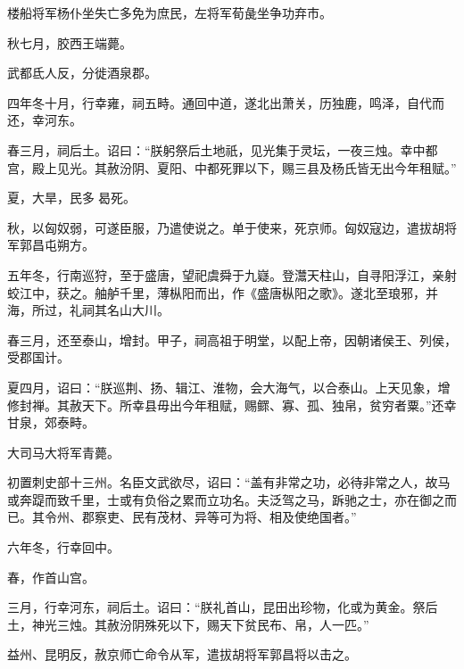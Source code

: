 \documentclass[12pt,UTF8]{ctexbook}
\begin{document}
楼船将军杨仆坐失亡多免为庶民，左将军荀彘坐争功弃市。



秋七月，胶西王端薨。



武都氐人反，分徙酒泉郡。



四年冬十月，行幸雍，祠五畤。通回中道，遂北出萧关，历独鹿，鸣泽，自代而还，幸河东。



春三月，祠后土。诏曰：“朕躬祭后土地祇，见光集于灵坛，一夜三烛。幸中都宫，殿上见光。其赦汾阴、夏阳、中都死罪以下，赐三县及杨氏皆无出今年租赋。”



夏，大旱，民多曷死。



秋，以匈奴弱，可遂臣服，乃遣使说之。单于使来，死京师。匈奴寇边，遣拔胡将军郭昌屯朔方。



五年冬，行南巡狩，至于盛唐，望祀虞舜于九嶷。登灊天柱山，自寻阳浮江，亲射蛟江中，获之。舳舻千里，薄枞阳而出，作《盛唐枞阳之歌》。遂北至琅邪，并海，所过，礼祠其名山大川。



春三月，还至泰山，增封。甲子，祠高祖于明堂，以配上帝，因朝诸侯王、列侯，受郡国计。



夏四月，诏曰：“朕巡荆、扬、辑江、淮物，会大海气，以合泰山。上天见象，增修封禅。其赦天下。所幸县毋出今年租赋，赐鳏、寡、孤、独帛，贫穷者粟。”还幸甘泉，郊泰畤。



大司马大将军青薨。



初置刺史部十三州。名臣文武欲尽，诏曰：“盖有非常之功，必待非常之人，故马或奔踶而致千里，士或有负俗之累而立功名。夫泛驾之马，跅驰之士，亦在御之而已。其令州、郡察吏、民有茂材、异等可为将、相及使绝国者。”



六年冬，行幸回中。



春，作首山宫。



三月，行幸河东，祠后土。诏曰：“朕礼首山，昆田出珍物，化或为黄金。祭后土，神光三烛。其赦汾阴殊死以下，赐天下贫民布、帛，人一匹。”



益州、昆明反，赦京师亡命令从军，遣拔胡将军郭昌将以击之。
\end{document}
